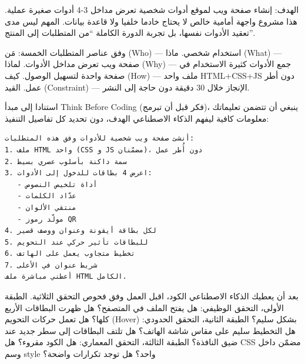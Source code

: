 



الهدف: إنشاء صفحة ويب لموقع أدوات شخصية تعرض مداخل 3-4 أدوات صغيرة عملية. هذا مشروع واجهة أمامية خالص لا يحتاج خادما خلفيا ولا قاعدة بيانات. المهم ليس مدى تعقيد الأدوات نفسها، بل تجربة الدورة الكاملة “من المتطلبات إلى المنتج”.

وفق عناصر المتطلبات الخمسة: مَن (Who) — استخدام شخصي. ماذا (What) — صفحة ويب تعرض مداخل الأدوات. لماذا (Why) — جمع الأدوات كثيرة الاستخدام في صفحة واحدة لتسهيل الوصول. كيف (How) — ملف واحد HTML+CSS+JS دون أطر عمل. القيد (Constraint) — الإنجاز خلال 30 دقيقة دون حاجة إلى النشر.


استنادا إلى مبدأ Think Before Coding (فكر قبل أن تبرمج)، ينبغي أن تتضمن تعليماتك معلومات كافية ليفهم الذكاء الاصطناعي الهدف، دون تحديد كل تفاصيل التنفيذ:

\begin{lstlisting}
أنشئ صفحة ويب شخصية للأدوات وفق هذه المتطلبات:
1. ملف HTML واحد (CSS و JS مضمّنان)، دون أُطر عمل
2. سمة داكنة بأسلوب عصري بسيط
3. اعرض 4 بطاقات للدخول إلى الأدوات:
   - أداة تلخيص النصوص
   - عدّاد الكلمات
   - منتقي الألوان
   - مولّد رموز QR
4. لكل بطاقة أيقونة وعنوان ووصف قصير
5. للبطاقات تأثير حركي عند التحويم
6. تخطيط متجاوب يعمل على الهاتف
7. شريط عنوان في الأعلى
أعطني مباشرة ملف HTML الكامل.
\end{lstlisting}


بعد أن يعطيك الذكاء الاصطناعي الكود، اقبل العمل وفق فحوص التحقق الثلاثية. الطبقة الأولى، التحقق الوظيفي: هل يفتح الملف في المتصفح؟ هل ظهرت البطاقات الأربع كلها؟ هل تعمل حركات التحويم (Hover) بشكل سليم؟ الطبقة الثانية، التحقق الحدودي: هل التخطيط سليم على مقاس شاشة الهاتف؟ هل تلتف البطاقات إلى سطر جديد عند ضيق النافذة؟ الطبقة الثالثة، التحقق المعماري: هل الكود مقروء؟ هل CSS مضمّن داخل وسم style واحد؟ هل توجد تكرارات واضحة؟


